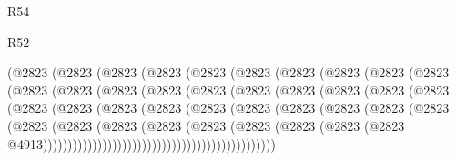 \begin{lexlean}{R54}
\begin{lexlean}{R52}
\begin{coremodule}
{{{{{{{{{{{{{{{{{{{{{{{{{{{{{{{{{{{{{{{{{{{{{{{{{{{{{{{{{{{{{{{{{{{{{{{{{{{{{{{{{{{{{{{{{{{{{{{{{{{{{{{{{{{{{{{{{{{{{{{{{{{{{{{{{{{{{{{{{{{{{{{{{{{{{{{{{{{{{{{{{{{{{{{{{{{{{{{{{{{{{{{{{{{{{{{{{{{{{{                    (@2823
                      (@2823
                        (@2823
                          (@2823
                            (@2823
                              (@2823
                                (@2823
                                  (@2823
                                    (@2823
                                      (@2823
                                        (@2823
                                          (@2823
                                            (@2823
                                              (@2823
                                                (@2823
                                                  (@2823
                                                    (@2823
                                                      (@2823
                                                        (@2823
                                                          (@2823
                                                            (@2823
                                                              (@2823
                                                                (@2823
                                                                  (@2823
                                                                    (@2823
                                                                      (@2823
                                                                        (@2823
                                                                          (@2823
                                                                            (@2823
                                                                              (@2823
                                                                                (@2823
                                                                                  (@2823
                                                                                    (@2823
                                                                                      (@2823
                                                                                        (@2823
                                                                                          (@2823
                                                                                            (@2823
                                                                                              (@2823
                                                                                                (@2823
                                                                                                  @4913)))))))))))))))))))))))))))))))))))))))))))))))
}}}}}}}}}}}}}}}}}}}}}}}}}}}}}}}}}}}}}}}}}}}}}}}}}}}}}}}}}}}}}}}}}}}}}}}}}}}}}}}}}}}}}}}}}}}}}}}}}}}}}}}}}}}}}}}}}}}}}}}}}}}}}}}}}}}}}}}}}}}}}}}}}}}}}}}}}}}}}}}}}}}}}}}}}}}}}}}}}}}}}}}}}}}}}}}}}}}}}}
\end{coremodule}
\end{lexlean}
\end{lexlean}
